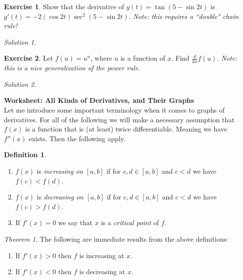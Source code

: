 \documentclass[leqno]{article}
\theoremstyle{definition}
\newtheorem{definition}{Definition}[section]
\newtheorem{exercise}{Exercise}[section]
\theoremstyle{remark}
\newtheorem*{solution}{Solution}
\theoremstyle{theorem}
\newtheorem{theorem}{Theorem}[section]
\begin{document}
\begin{exercise}
Show that the derivative of $g(t)=\tan(5-\sin 2t)$ is $g'(t)=-2(\cos 2t) \sec^2(5-\sin 2t)$. \emph{Note: this requires a ``double" chain rule!}
\begin{solution}~
\vspace*{6cm}
\end{solution}
\end{exercise}

\begin{exercise}
Let $f(u)=u^n$, where $u$ is a function of $x$.  Find $\frac{d}{dx} f(u)$.  \emph{Note: this is a nice generalization of the power rule.}
\begin{solution}~
\vspace*{6cm}
\end{solution}
\end{exercise}

\pagebreak

\noindent \textbf{\large{Worksheet: All Kinds of Derivatives, and Their Graphs}}\\


\noindent Let me introduce some important terminology when it comes to graphs of derivatives.  For all of the following we will make a necessary assumption that $f(x)$ is a function that is (at least) twice differentiable.  Meaning we have $f''(x)$ exists. Then the following apply.

\begin{definition} 
\begin{enumerate}[1.]
\item $f(x)$ is \emph{increasing on $[a,b]$} if for $c,d \in [a,b]$ and $c<d$ we have $f(c)< f(d)$.
\item $f(x)$ is \emph{decreasing on $[a,b]$} if for $c,d \in [a,b]$ and $c<d$ we have $f(c)> f(d)$.
\item If $f'(x)=0$ we say that $x$ is a \emph{critical point} of $f$.
\end{enumerate}
\end{definition}


\begin{theorem} The following are immediate results from the above definitions:
\begin{enumerate}[1.]
\item If $f'(x)>0$ then $f$ is increasing at $x$. 
\item If $f'(x)<0$ then $f$ is decreasing at $x$.
\end{enumerate}
\end{theorem}
\end{document}
